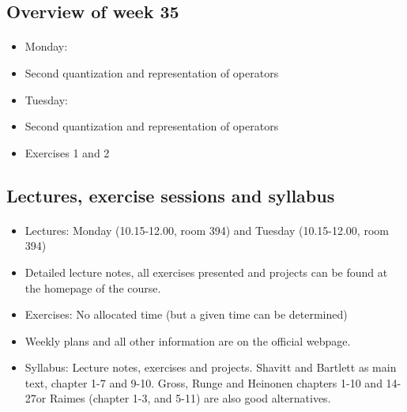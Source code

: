 \documentclass[%
twoside,                 %
final,                   %
10pt]{article}
\begin{document}
\noindent



\subsection{Overview of week 35}

\paragraph{}
\begin{itemize}
\item Monday:

\item Second quantization and representation of operators

\item Tuesday:

\item Second quantization and representation of operators

\item Exercises 1 and 2
\end{itemize}

\noindent




\subsection{Lectures, exercise sessions and syllabus}

\paragraph{}
\begin{itemize}
\item Lectures: Monday (10.15-12.00, room 394) and Tuesday (10.15-12.00, room 394)

\item Detailed lecture notes, all exercises presented and projects can be found at the homepage of the course.

\item Exercises: No allocated time (but a given time can be determined)

\item Weekly plans and all other information are on the official webpage.

\item Syllabus: Lecture notes, exercises and projects. Shavitt and Bartlett as main text, chapter 1-7 and 9-10. Gross, Runge and Heinonen chapters 1-10 and 14-27or  Raimes (chapter 1-3, and 5-11) are also good alternatives.
\end{itemize}
\end{document}
